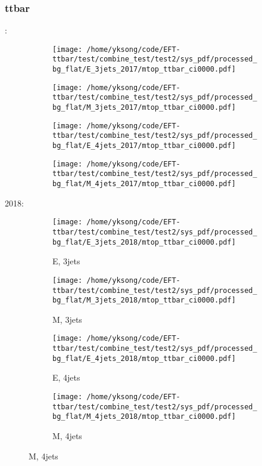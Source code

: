 \documentclass{beamer}
\begin{document}
\begin{frame}
\frametitle{ttbar}
\fontsize{5}{1}:
\begin{figure}
\centering
\begin{subfigure}[b]{0.24\textwidth}
\texttt{[image: /home/yksong/code/EFT-ttbar/test/combine\_test/test2/sys\_pdf/processed\_bg\_flat/E\_3jets\_2017/mtop\_ttbar\_ci0000.pdf]}
\end{subfigure}
\begin{subfigure}[b]{0.24\textwidth}
\texttt{[image: /home/yksong/code/EFT-ttbar/test/combine\_test/test2/sys\_pdf/processed\_bg\_flat/M\_3jets\_2017/mtop\_ttbar\_ci0000.pdf]}
\end{subfigure}
\begin{subfigure}[b]{0.24\textwidth}
\texttt{[image: /home/yksong/code/EFT-ttbar/test/combine\_test/test2/sys\_pdf/processed\_bg\_flat/E\_4jets\_2017/mtop\_ttbar\_ci0000.pdf]}
\end{subfigure}
\begin{subfigure}[b]{0.24\textwidth}
\texttt{[image: /home/yksong/code/EFT-ttbar/test/combine\_test/test2/sys\_pdf/processed\_bg\_flat/M\_4jets\_2017/mtop\_ttbar\_ci0000.pdf]}
\end{subfigure}
\end{figure}
2018:
\begin{figure}
\centering
\begin{subfigure}[b]{0.24\textwidth}
\texttt{[image: /home/yksong/code/EFT-ttbar/test/combine\_test/test2/sys\_pdf/processed\_bg\_flat/E\_3jets\_2018/mtop\_ttbar\_ci0000.pdf]}
\captionsetup{font=tiny}
\caption{E, 3jets}
\end{subfigure}
\begin{subfigure}[b]{0.24\textwidth}
\texttt{[image: /home/yksong/code/EFT-ttbar/test/combine\_test/test2/sys\_pdf/processed\_bg\_flat/M\_3jets\_2018/mtop\_ttbar\_ci0000.pdf]}
\captionsetup{font=tiny}
\caption{M, 3jets}
\end{subfigure}
\begin{subfigure}[b]{0.24\textwidth}
\texttt{[image: /home/yksong/code/EFT-ttbar/test/combine\_test/test2/sys\_pdf/processed\_bg\_flat/E\_4jets\_2018/mtop\_ttbar\_ci0000.pdf]}
\captionsetup{font=tiny}
\caption{E, 4jets}
\end{subfigure}
\begin{subfigure}[b]{0.24\textwidth}
\texttt{[image: /home/yksong/code/EFT-ttbar/test/combine\_test/test2/sys\_pdf/processed\_bg\_flat/M\_4jets\_2018/mtop\_ttbar\_ci0000.pdf]}
\captionsetup{font=tiny}
\caption{M, 4jets}
\end{subfigure}
\end{figure}
\end{frame}
\end{document}

